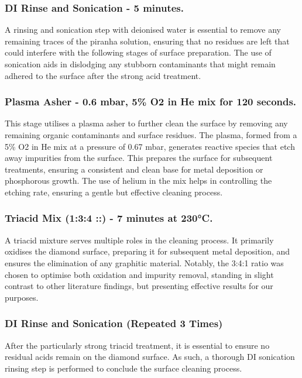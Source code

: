\subsubsection{DI Rinse and Sonication - 5 minutes.}
A rinsing and sonication step with deionised water is essential to remove any remaining traces of the piranha solution, ensuring that no residues are left that could interfere with the following stages of surface preparation. The use of sonication aids in dislodging any stubborn contaminants that might remain adhered to the surface after the strong acid treatment.

\subsubsection{Plasma Asher - 0.6 mbar, 5\% O2 in He mix for 120 seconds.}
This stage utilises a plasma asher to further clean the surface by removing any remaining organic contaminants and surface residues. The plasma, formed from a 5\% O2 in He mix at a pressure of 0.67 mbar, generates reactive species that etch away impurities from the surface. This prepares the surface for subsequent treatments, ensuring a consistent and clean base for metal deposition or phosphorous growth. The use of helium in the mix helps in controlling the etching rate, ensuring a gentle but effective cleaning process.

\subsubsection{Triacid Mix (1:3:4 ::) - 7 minutes at 230\si{\degreeCelsius}.}
A triacid mixture serves multiple roles in the cleaning process. It primarily oxidises the diamond surface, preparing it for subsequent metal deposition, and ensures the elimination of any graphitic material. Notably, the 3:4:1 ratio was chosen to optimise both oxidation and impurity removal, standing in slight contrast to other literature findings, but presenting effective results for our purposes. 

\subsubsection{DI Rinse and Sonication (Repeated 3 Times)}
After the particularly strong triacid treatment, it is essential to ensure no residual acids remain on the diamond surface. As such, a thorough DI sonication rinsing step is performed to conclude the surface cleaning process.

